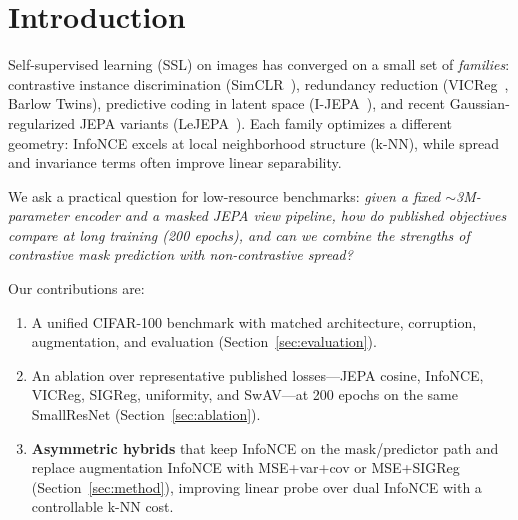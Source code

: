 \section{Introduction}
\label{sec:intro}

Self-supervised learning (SSL) on images has converged on a small set of
\emph{families}: contrastive instance discrimination
(SimCLR~\cite{chen2020simclr}), redundancy reduction
(VICReg~\cite{bardes2022vicreg}, Barlow Twins), predictive coding in latent
space (I-JEPA~\cite{assran2023ijepa}), and recent Gaussian-regularized JEPA
variants (LeJEPA~\cite{balestriero2025lejepa}).
Each family optimizes a different geometry: InfoNCE excels at local
neighborhood structure (k-NN), while spread and invariance terms often
improve linear separability.

We ask a practical question for low-resource benchmarks: \emph{given a fixed
$\sim$3M-parameter encoder and a masked JEPA view pipeline, how do published
objectives compare at long training (200 epochs), and can we combine the
strengths of contrastive mask prediction with non-contrastive spread?}

Our contributions are:
\begin{enumerate}
  \item A unified CIFAR-100 benchmark with matched architecture, corruption,
        augmentation, and evaluation (Section~\ref{sec:evaluation}).
  \item An ablation over representative published losses---JEPA cosine,
        InfoNCE, VICReg, SIGReg, uniformity, and SwAV---at 200 epochs on the
        same SmallResNet (Section~\ref{sec:ablation}).
  \item \textbf{Asymmetric hybrids} that keep InfoNCE on the mask/predictor
        path and replace augmentation InfoNCE with MSE+var+cov or MSE+SIGReg
        (Section~\ref{sec:method}), improving linear probe over dual InfoNCE
        with a controllable k-NN cost.
\end{enumerate}
